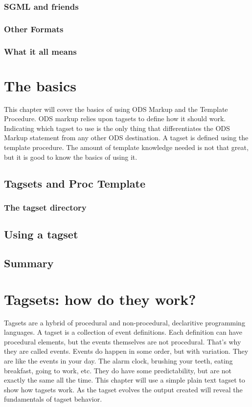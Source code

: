 \documentclass{book}
\begin{document}
\subsection{SGML and friends}

\subsection{Other Formats}

\subsection{What it all means}

\chapter{The basics}
This chapter will cover the basics of using ODS Markup and the Template Procedure.
ODS markup relies upon tagsets to define how it should work.  
Indicating which tagset to use is the only thing that
differentiates the ODS Markup statement from any other ODS destination.
A tagset is defined using the template procedure.  The amount of
template knowledge needed is not that great, but it is good to know
the basics of using it.
\section{Tagsets and Proc Template}

\subsection{The tagset directory}

\section{Using a tagset}

\section{Summary}

\chapter{Tagsets: how do they work?}
Tagsets are a hybrid of procedural and non-procedural, declaritive
programming languages.  A tagset is a collection of event definitions.
Each definition can have procedural elements, but the events themselves
are not procedural.  That's why they are called events.  Events do happen
in some order, but with variation.  They are like the events in your
day.  The alarm clock, brushing your teeth, eating breakfast, going
to work, etc.  They do have some predictability, but are not exactly
the same all the time.  This chapter will use a simple plain text
tagset to show how tagsets work.  As the tagset evolves the 
output created will reveal the fundamentals of tagset behavior. 
\end{document}
